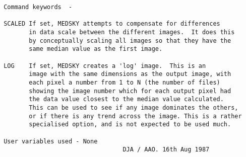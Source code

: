 \begin{description}
\begin{verbatim}
 Command keywords  -

 SCALED If set, MEDSKY attempts to compensate for differences
        in data scale between the different images.  It does this
        by conceptually scaling all images so that they have the
        same median value as the first image.

 LOG    If set, MEDSKY creates a 'log' image.  This is an
        image with the same dimensions as the output image, with
        each pixel a number from 1 to N (the number of files)
        showing the image number which for each output pixel had
        the data value closest to the median value calculated.
        This can be used to see if any image dominates the others,
        or if there is any trend across the image. This is a rather
        specialised option, and is not expected to be used much.

 User variables used - None
                                  DJA / AAO. 16th Aug 1987
\end{verbatim}
\end{description}
